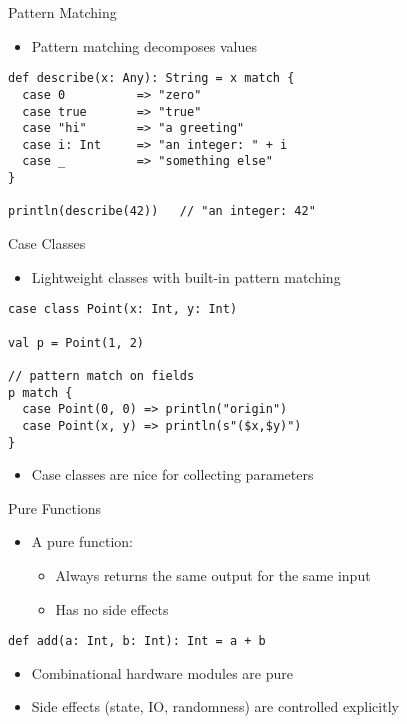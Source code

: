 \begin{frame}[fragile]{Pattern Matching}
\begin{itemize}
    \item Pattern matching decomposes values
\end{itemize}

\begin{verbatim}
def describe(x: Any): String = x match {
  case 0          => "zero"
  case true       => "true"
  case "hi"       => "a greeting"
  case i: Int     => "an integer: " + i
  case _          => "something else"
}

println(describe(42))   // "an integer: 42"
\end{verbatim}
\end{frame}

\begin{frame}[fragile]{Case Classes}
\begin{itemize}
    \item Lightweight classes with built-in pattern matching
\end{itemize}

\begin{verbatim}
case class Point(x: Int, y: Int)

val p = Point(1, 2)

// pattern match on fields
p match {
  case Point(0, 0) => println("origin")
  case Point(x, y) => println(s"($x,$y)")
}
\end{verbatim}

\begin{itemize}
    \item Case classes are nice for collecting parameters
\end{itemize}
\end{frame}

\begin{frame}[fragile]{Pure Functions}
\begin{itemize}
    \item A pure function:
    \begin{itemize}
        \item Always returns the same output for the same input
        \item Has no side effects
    \end{itemize}
\end{itemize}

\begin{verbatim}
def add(a: Int, b: Int): Int = a + b
\end{verbatim}
\begin{itemize}
    \item Combinational hardware modules are pure
    \item Side effects (state, IO, randomness) are controlled explicitly
\end{itemize}
\end{frame}



